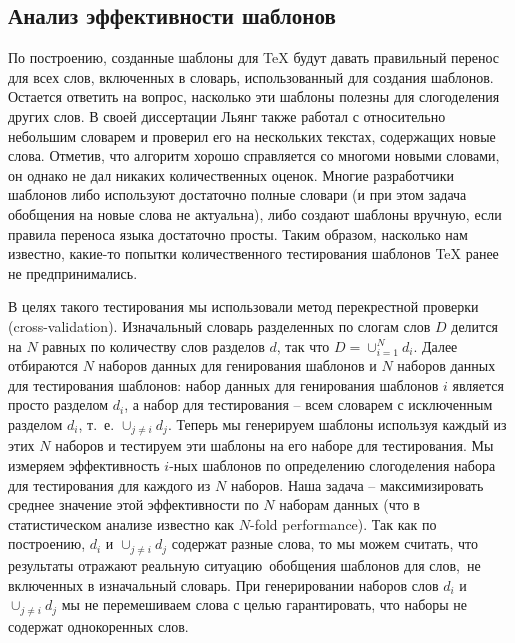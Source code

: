 \documentclass[12pt,a4paper,oneside]{extarticle}
\begin{document}
\subsection{Анализ эффективности шаблонов}

По построению, созданные шаблоны для \TeX{} будут давать правильный перенос для всех слов, включенных в словарь, использованный для создания шаблонов. Остается ответить на вопрос, насколько эти шаблоны полезны для слогоделения других слов. В своей диссертации Льянг также работал с относительно небольшим словарем и проверил его на нескольких текстах, содержащих новые слова. Отметив, что алгоритм хорошо справляется со многоми новыми словами, он однако не дал никаких количественных оценок. Многие разработчики шаблонов либо используют достаточно полные словари (и при этом задача обобщения на новые слова не актуальна), либо создают шаблоны вручную, если правила переноса языка достаточно просты. Таким образом, насколько нам известно, какие-то попытки количественного тестирования шаблонов \TeX{} ранее не предпринимались.

В целях такого тестирования мы использовали метод перекрестной проверки (\textenglish{cross-validation}). Изначальный словарь разделенных по слогам слов $D$ делится на $N$ равных по количеству слов разделов $d$, так что $D = \cup_{i = 1}^{N} d_i$. Далее отбираются $N$ наборов данных для генирования шаблонов и $N$ наборов данных для тестирования шаблонов: набор данных для генирования шаблонов $i$ является просто разделом $d_i$, а набор для тестирования -- всем словарем с исключенным разделом $d_i$, т.~е. $\cup_{j \neq i} d_j$. Теперь мы генерируем шаблоны используя каждый из этих $N$ наборов и тестируем эти шаблоны на его наборе для тестирования. Мы измеряем эффективность  $i$-ных шаблонов по определению слогоделения набора для тестирования для каждого из $N$ наборов. Наша задача -- максимизировать среднее значение этой эффективности по $N$ наборам данных (что в статистическом анализе известно как \textenglish{$N$-fold performance}). Так как по построению, $d_i$ и $\cup_{j \neq i} d_j$ содержат разные слова, то мы можем считать, что результаты отражают реальную ситуацию обобщения шаблонов для слов, не включенных в изначальный словарь. При генерировании наборов слов $d_i$ и $\cup_{j \neq i} d_j$ мы не перемешиваем слова с целью гарантировать, что наборы не содержат однокоренных слов.

\end{document}
